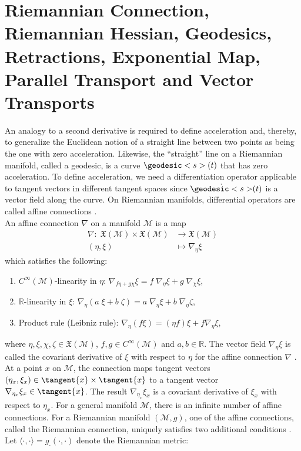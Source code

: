 \section{Riemannian Connection, Riemannian Hessian, Geodesics, Retractions, Exponential Map, Parallel Transport and Vector Transports}
\label{Section3.4}

An analogy to a second derivative is required to define acceleration and, thereby, to generalize the Euclidean notion of a straight line between two points as being the one with zero acceleration. Likewise, the “straight” line on a Riemannian manifold, called a geodesic, is a curve $\geodesic<s>(t)$ that has zero acceleration. To define acceleration, we need a differentiation operator applicable to tangent vectors in different tangent spaces since $\dot{\geodesic<s>}(t)$ is a vector field along the curve. On Riemannian manifolds, differential operators are called affine connections \cite[p.~6]{Huang:2013}.\\
An affine connection $\nabla$ on a manifold $\mathcal{M}$ is a map 
\begin{align*}
    \nabla \colon \; \mathfrak{X}(\mathcal{M}) \times \mathfrak{X}(\mathcal{M}) & \to \mathfrak{X}(\mathcal{M}) \\
    (\eta, \xi) & \mapsto \nabla_{\eta} \xi
\end{align*}
which satisfies the following:
\begin{enumerate}
    \item $C^{\infty}(\mathcal{M})$-linearity in $\eta$: $\nabla_{f \eta + g \chi} \xi = f \; \nabla_{\eta} \xi + g \; \nabla_{\chi} \xi$,
    \item $\mathbb{R}$-linearity in $\xi$: $\nabla_{\eta} (a \; \xi + b \; \zeta) = a \; \nabla_{\eta} \xi + b \; \nabla_{\eta} \zeta$,
    \item Product rule (Leibniz rule): $\nabla_{\eta} (f \xi) = (\eta f) \xi + f \nabla_{\eta} \xi$,
\end{enumerate}
where $\eta, \xi, \chi, \zeta \in \mathfrak{X}(\mathcal{M})$, $f,g \in C^{\infty}(\mathcal{M})$ and $a,b \in \mathbb{R}$. The vector field $\nabla_{\eta} \xi$ is called the covariant derivative of $\xi$ with respect to $\eta$ for the affine connection $\nabla$ \cite[p.~94]{AbsilMahonySepulchre:2008}. At a point $x$ on $\mathcal{M}$, the connection maps tangent vectors $(\eta_x, \xi_x) \in \tangent{x} \times \tangent{x}$ to a tangent vector $\nabla_{\eta_x} \xi_x \in \tangent{x}$. The result $\nabla_{\eta_x} \xi_x$ is a covariant derivative of $\xi_x$ with respect to $\eta_x$. For a general manifold $\mathcal{M}$, there is an infinite number of affine connections. For a Riemannian manifold $(\mathcal{M}, g)$, one of the affine connections, called the Riemannian connection, uniquely satisfies two additional conditions \cite[p.~6]{Huang:2013}. Let $\langle \cdot, \cdot \rangle = g_{\cdot}(\cdot, \cdot)$ denote the Riemannian metric:

